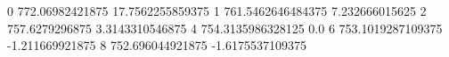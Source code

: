 0 772.06982421875 17.7562255859375
1 761.5462646484375 7.232666015625
2 757.6279296875 3.3143310546875
4 754.3135986328125 0.0
6 753.1019287109375 -1.211669921875
8 752.696044921875 -1.6175537109375
